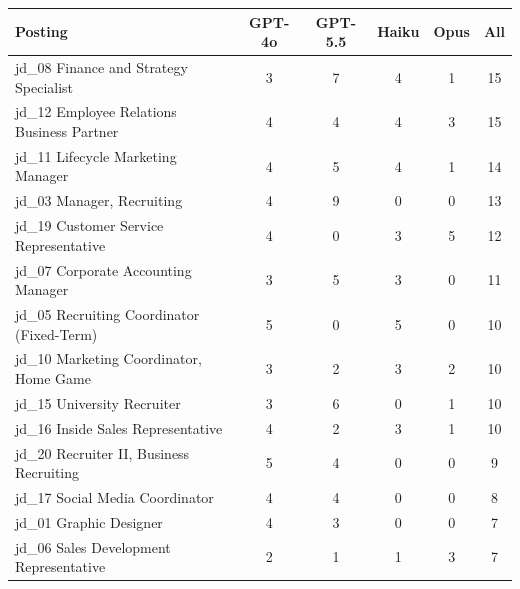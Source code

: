 \begin{tabular}{@{}lccccc@{}}
\toprule
Posting & GPT-4o & GPT-5.5 & Haiku & Opus & All \\
\midrule
jd\_08 Finance and Strategy Specialist & \cellcolor{blue!18}3 & \cellcolor{blue!42}7 & \cellcolor{blue!24}4 & \cellcolor{blue!6}1 & 15 \\
jd\_12 Employee Relations Business Partner & \cellcolor{blue!24}4 & \cellcolor{blue!24}4 & \cellcolor{blue!24}4 & \cellcolor{blue!18}3 & 15 \\
jd\_11 Lifecycle Marketing Manager & \cellcolor{blue!24}4 & \cellcolor{blue!30}5 & \cellcolor{blue!24}4 & \cellcolor{blue!6}1 & 14 \\
jd\_03 Manager, Recruiting & \cellcolor{blue!24}4 & \cellcolor{blue!54}9 & \cellcolor{blue!0}0 & \cellcolor{blue!0}0 & 13 \\
jd\_19 Customer Service Representative & \cellcolor{blue!24}4 & \cellcolor{blue!0}0 & \cellcolor{blue!18}3 & \cellcolor{blue!30}5 & 12 \\
jd\_07 Corporate Accounting Manager & \cellcolor{blue!18}3 & \cellcolor{blue!30}5 & \cellcolor{blue!18}3 & \cellcolor{blue!0}0 & 11 \\
jd\_05 Recruiting Coordinator (Fixed-Term) & \cellcolor{blue!30}5 & \cellcolor{blue!0}0 & \cellcolor{blue!30}5 & \cellcolor{blue!0}0 & 10 \\
jd\_10 Marketing Coordinator, Home Game & \cellcolor{blue!18}3 & \cellcolor{blue!12}2 & \cellcolor{blue!18}3 & \cellcolor{blue!12}2 & 10 \\
jd\_15 University Recruiter & \cellcolor{blue!18}3 & \cellcolor{blue!36}6 & \cellcolor{blue!0}0 & \cellcolor{blue!6}1 & 10 \\
jd\_16 Inside Sales Representative & \cellcolor{blue!24}4 & \cellcolor{blue!12}2 & \cellcolor{blue!18}3 & \cellcolor{blue!6}1 & 10 \\
jd\_20 Recruiter II, Business Recruiting & \cellcolor{blue!30}5 & \cellcolor{blue!24}4 & \cellcolor{blue!0}0 & \cellcolor{blue!0}0 & 9 \\
jd\_17 Social Media Coordinator & \cellcolor{blue!24}4 & \cellcolor{blue!24}4 & \cellcolor{blue!0}0 & \cellcolor{blue!0}0 & 8 \\
jd\_01 Graphic Designer & \cellcolor{blue!24}4 & \cellcolor{blue!18}3 & \cellcolor{blue!0}0 & \cellcolor{blue!0}0 & 7 \\
jd\_06 Sales Development Representative & \cellcolor{blue!12}2 & \cellcolor{blue!6}1 & \cellcolor{blue!6}1 & \cellcolor{blue!18}3 & 7 \\

\end{tabular}
